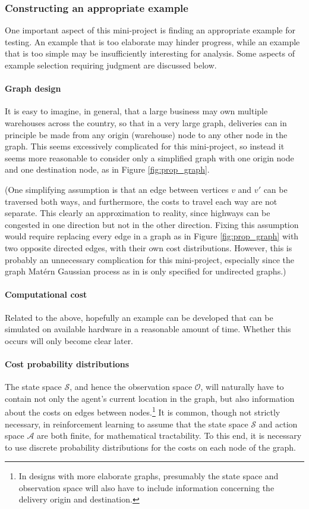 \subsubsection{Constructing an appropriate example}

One important aspect of this mini-project is finding an appropriate example for testing. An example that is too elaborate may hinder progress, while an example that is too simple may be insufficiently interesting for analysis. Some aspects of example selection requiring judgment are discussed below.

\paragraph{Graph design} It is easy to imagine, in general, that a large business may own multiple warehouses across the country, so that in a very large graph, deliveries can in principle be made from any origin (warehouse) node to any other node in the graph. This seems excessively complicated for this mini-project, so instead it seems more reasonable to consider only a simplified graph with one origin node and one destination node, as in Figure \ref{fig:prop_graph}.

(One simplifying assumption is that an edge between vertices $v$ and $v'$ can be traversed both ways, and furthermore, the costs to travel each way are not separate. This clearly an approximation to reality, since highways can be congested in one direction but not in the other direction. Fixing this assumption would require replacing every edge in a graph as in Figure \ref{fig:prop_graph} with two opposite directed edges, with their own cost distributions. However, this is probably an unnecessary complication for this mini-project, especially since the graph Mat\'{e}rn Gaussian process as in \cite{pmlr-v130-borovitskiy21a} is only specified for undirected graphs.)

\paragraph{Computational cost} Related to the above, hopefully an example can be developed that can be simulated on available hardware in a reasonable amount of time. Whether this occurs will only become clear later.

\paragraph{Cost probability distributions} The state space $\mathcal S$, and hence the observation space $\mathcal O$, will naturally have to contain not only the agent's current location in the graph, but also information about the costs on edges between nodes.\footnote{In designs with more elaborate graphs, presumably the state space and observation space will also have to include information concerning the delivery origin and destination.} It is common, though not strictly necessary, in reinforcement learning to assume that the state space $\mathcal S$ and action space $\mathcal A$ are both finite, for mathematical tractability. To this end, it is necessary to use discrete probability distributions for the costs on each node of the graph.

